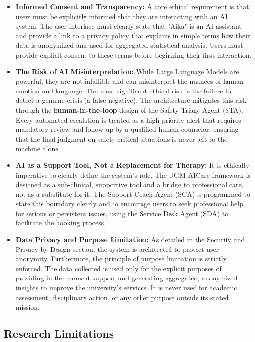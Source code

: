 \begin{itemize}
    \item \textbf{Informed Consent and Transparency:} A core ethical requirement is that users must be explicitly informed that they are interacting with an AI system. The user interface must clearly state that "Aika" is an AI assistant and provide a link to a privacy policy that explains in simple terms how their data is anonymized and used for aggregated statistical analysis. Users must provide explicit consent to these terms before beginning their first interaction.
    \item \textbf{The Risk of AI Misinterpretation:} While Large Language Models are powerful, they are not infallible and can misinterpret the nuances of human emotion and language. The most significant ethical risk is the failure to detect a genuine crisis (a false negative). The architecture mitigates this risk through the \textbf{human-in-the-loop} design of the Safety Triage Agent (STA). Every automated escalation is treated as a high-priority alert that requires mandatory review and follow-up by a qualified human counselor, ensuring that the final judgment on safety-critical situations is never left to the machine alone.
    \item \textbf{AI as a Support Tool, Not a Replacement for Therapy:} It is ethically imperative to clearly define the system's role. The UGM-AICare framework is designed as a sub-clinical, supportive tool and a bridge to professional care, not as a substitute for it. The Support Coach Agent (SCA) is programmed to state this boundary clearly and to encourage users to seek professional help for serious or persistent issues, using the Service Desk Agent (SDA) to facilitate the booking process.
    \item \textbf{Data Privacy and Purpose Limitation:} As detailed in the Security and Privacy by Design section, the system is architected to protect user anonymity. Furthermore, the principle of purpose limitation is strictly enforced. The data collected is used only for the explicit purposes of providing in-the-moment support and generating aggregated, anonymized insights to improve the university's services. It is never used for academic assessment, disciplinary action, or any other purpose outside its stated mission.
\end{itemize}

\subsection{Research Limitations}

